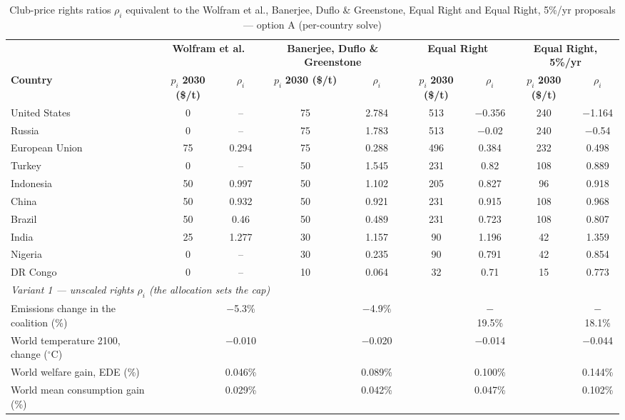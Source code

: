 \begin{table}[htbp]
\centering
\small
\caption{Club-price rights ratios $\rho_i$ equivalent to the Wolfram et al., Banerjee, Duflo \& Greenstone, Equal Right and Equal Right, 5\%/yr proposals --- option A (per-country solve)}
\renewcommand{\arraystretch}{1.15}
\begin{tabular}{lcccccccc}
  \toprule
  & \multicolumn{2}{c}{\textbf{Wolfram et al.}} & \multicolumn{2}{c}{\textbf{Banerjee, Duflo \& Greenstone}} & \multicolumn{2}{c}{\textbf{Equal Right}} & \multicolumn{2}{c}{\textbf{Equal Right, 5\%/yr}} \\
  \cmidrule(lr){2-3} \cmidrule(lr){4-5} \cmidrule(lr){6-7} \cmidrule(lr){8-9}
  \textbf{Country} & $p_i$ \textbf{2030 (\$/t)} & $\rho_i$ & $p_i$ \textbf{2030 (\$/t)} & $\rho_i$ & $p_i$ \textbf{2030 (\$/t)} & $\rho_i$ & $p_i$ \textbf{2030 (\$/t)} & $\rho_i$ \\
  \midrule
  United States & 0 & -- & 75 & 2.784 & 513 & $-$0.356 & 240 & $-$1.164 \\
  Russia & 0 & -- & 75 & 1.783 & 513 & $-$0.02 & 240 & $-$0.54 \\
  European Union & 75 & 0.294 & 75 & 0.288 & 496 & 0.384 & 232 & 0.498 \\
  Turkey & 0 & -- & 50 & 1.545 & 231 & 0.82 & 108 & 0.889 \\
  Indonesia & 50 & 0.997 & 50 & 1.102 & 205 & 0.827 & 96 & 0.918 \\
  China & 50 & 0.932 & 50 & 0.921 & 231 & 0.915 & 108 & 0.968 \\
  Brazil & 50 & 0.46 & 50 & 0.489 & 231 & 0.723 & 108 & 0.807 \\
  India & 25 & 1.277 & 30 & 1.157 & 90 & 1.196 & 42 & 1.359 \\
  Nigeria & 0 & -- & 30 & 0.235 & 90 & 0.791 & 42 & 0.854 \\
  DR Congo & 0 & -- & 10 & 0.064 & 32 & 0.71 & 15 & 0.773 \\
  \midrule
  \multicolumn{9}{l}{\textit{Variant 1 --- unscaled rights $\rho_i$ (the allocation sets the cap)}} \\
  \quad Emissions change in the coalition (\%) &  & $-$5.3\% &  & $-$4.9\% &  & $-$19.5\% &  & $-$18.1\% \\
  \quad World temperature 2100, change ($^\circ$C) &  & $-$0.010 &  & $-$0.020 &  & $-$0.014 &  & $-$0.044 \\
  \quad World welfare gain, EDE (\%) &  & 0.046\% &  & 0.089\% &  & 0.100\% &  & 0.144\% \\
  \quad World mean consumption gain (\%) &  & 0.029\% &  & 0.042\% &  & 0.047\% &  & 0.102\% \\

\end{tabular}
\end{table}
